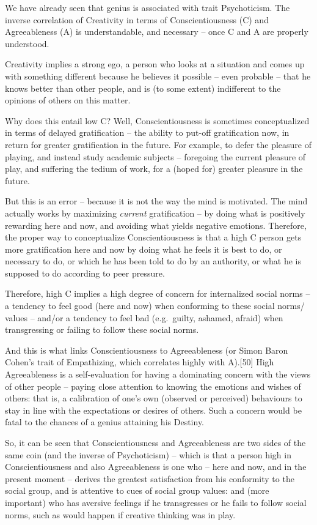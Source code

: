 \documentclass[
]{book}
\begin{document}
We have already seen that genius is associated with trait Psychoticism. The inverse correlation of Creativity in terms of Conscientiousness (C) and Agreeableness (A) is understandable, and necessary -- once C and A are properly understood.

Creativity implies a strong ego, a person who looks at a situation and comes up with something different because he believes it possible -- even probable -- that he knows better than other people, and is (to some extent) indifferent to the opinions of others on this matter.

Why does this entail low C? Well, Conscientiousness is sometimes conceptualized in terms of delayed gratification -- the ability to put-off gratification now, in return for greater gratification in the future. For example, to defer the pleasure of playing, and instead study academic subjects -- foregoing the current pleasure of play, and suffering the tedium of work, for a (hoped for) greater pleasure in the future.

But this is an error -- because it is not the way the mind is motivated. The mind actually works by maximizing \emph{current} gratification -- by doing what is positively rewarding here and now, and avoiding what yields negative emotions. Therefore, the proper way to conceptualize Conscientiousness is that a high C person gets more gratification here and now by doing what he feels it is best to do, or necessary to do, or which he has been told to do by an authority, or what he is supposed to do according to peer pressure.

Therefore, high C implies a high degree of concern for internalized social norms -- a tendency to feel good (here and now) when conforming to these social norms/ values -- and/or a tendency to feel bad (e.g.~guilty, ashamed, afraid) when transgressing or failing to follow these social norms.

And this is what links Conscientiousness to Agreeableness (or Simon Baron Cohen's trait of Empathizing, which correlates highly with A).{[}50{]} High Agreeableness is a self-evaluation for having a dominating concern with the views of other people -- paying close attention to knowing the emotions and wishes of others: that is, a calibration of one's own (observed or perceived) behaviours to stay in line with the expectations or desires of others. Such a concern would be fatal to the chances of a genius attaining his Destiny.

So, it can be seen that Conscientiousness and Agreeableness are two sides of the same coin (and the inverse of Psychoticism) -- which is that a person high in Conscientiousness and also Agreeableness is one who -- here and now, and in the present moment -- derives the greatest satisfaction from his conformity to the social group, and is attentive to cues of social group values: and (more important) who has aversive feelings if he transgresses or he fails to follow social norms, such as would happen if creative thinking was in play.
\end{document}
